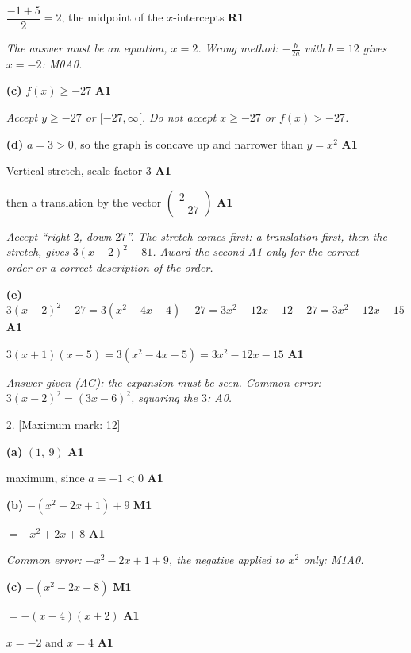 \documentclass[12pt, twoside]{article}
\begin{document}
\begin{enumerate}[itemsep=0.3cm]
$\dfrac{-1 + 5}{2} = 2$, the midpoint of the $x$-intercepts \hfill \textbf{R1}

\emph{The answer must be an equation, $x = 2$. Wrong method:
$-\frac{b}{2a}$ with $b = 12$ gives $x = -2$: M0A0.}

\textbf{(c)} $f(x) \ge -27$ \hfill \textbf{A1}

\emph{Accept $y \ge -27$ or $[-27, \infty[$. Do not accept $x \ge -27$ or
$f(x) > -27$.}

\textbf{(d)} $a = 3 > 0$, so the graph is concave up and narrower than
$y = x^{2}$ \hfill \textbf{A1}

Vertical stretch, scale factor $3$ \hfill \textbf{A1}

then a translation by the vector $\begin{pmatrix} 2 \\ -27 \end{pmatrix}$ \hfill \textbf{A1}

\emph{Accept ``right $2$, down $27$''. The stretch comes first: a translation
first, then the stretch, gives $3(x - 2)^{2} - 81$. Award the second A1
only for the correct order or a correct description of the order.}

\textbf{(e)} $3(x - 2)^{2} - 27 = 3(x^{2} - 4x + 4) - 27 = 3x^{2} - 12x + 12 - 27 = 3x^{2} - 12x - 15$ \hfill \textbf{A1}

$3(x + 1)(x - 5) = 3(x^{2} - 4x - 5) = 3x^{2} - 12x - 15$ \hfill \textbf{A1}

\emph{Answer given (AG): the expansion must be seen. Common error:
$3(x - 2)^{2} = (3x - 6)^{2}$, squaring the $3$: A0.}

\newpage

\item[2.] [Maximum mark: 12]

\textbf{(a)} $(1,\ 9)$ \hfill \textbf{A1}

maximum, since $a = -1 < 0$ \hfill \textbf{A1}

\textbf{(b)} $-(x^{2} - 2x + 1) + 9$ \hfill \textbf{M1}

$= -x^{2} + 2x + 8$ \hfill \textbf{A1}

\emph{Common error: $-x^{2} - 2x + 1 + 9$, the negative applied to $x^{2}$
only: M1A0.}

\textbf{(c)} $-(x^{2} - 2x - 8)$ \hfill \textbf{M1}

$= -(x - 4)(x + 2)$ \hfill \textbf{A1}

$x = -2$ and $x = 4$ \hfill \textbf{A1}


\end{enumerate}
\end{document}
